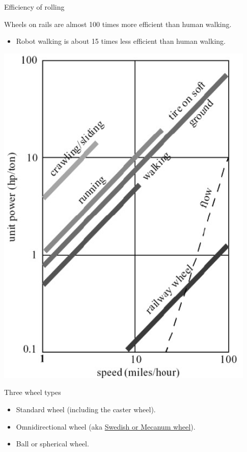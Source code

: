 \documentclass[compress]{beamer}
\begin{document}
\begin{frame}{Efficiency of rolling}

Wheels on rails are almost 100 times more efficient than human walking.

\begin{itemize}
    \item Robot walking is about 15 times less efficient than human walking.
\end{itemize}

    \begin{center}
        \includegraphics[width=0.8\linewidth]{rolling}
    \end{center}
\end{frame}

\begin{frame}{Three wheel types}

\begin{itemize}
    \item Standard wheel (including the caster wheel).
    \item Omnidirectional wheel (aka \href{http://en.wikipedia.org/wiki/Mecanum_wheel}{Swedish or Mecanum wheel}).
    \item Ball or spherical wheel.
\end{itemize}

\end{frame}
\end{document}
